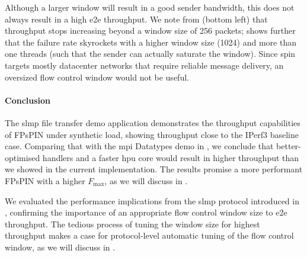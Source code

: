 Although a larger window will result in a good sender bandwidth, this does not always result in a high \ac{e2e} throughput.  We note from  (bottom left) that throughput stops increasing beyond a window size of 256 packets;  shows further that the failure rate skyrockets with a higher window size (1024) and more than one threads (such that the sender can actually saturate the window).  Since \ac{spin} targets mostly datacenter networks that require reliable message delivery, an oversized flow control window would not be useful.

\paragraph{Conclusion} The \ac{slmp} file transfer demo application demonstrates the throughput capabilities of FPsPIN under synthetic load, showing throughput close to the IPerf3 baseline case.  Comparing that with the \ac{mpi} Datatypes demo in , we conclude that better-optimised handlers and a faster \ac{hpu} core would result in higher throughput than we showed in the current implementation.  The results promise a more performant FPsPIN with a higher $F_\text{max}$, as we will discuss in .

We evaluated the performance implications from the \ac{slmp} protocol introduced in , confirming the importance of an appropriate flow control window size to \ac{e2e} throughput.  The tedious process of tuning the window size for highest throughput makes a case for protocol-level automatic tuning of the flow control window, as we will discuss in .